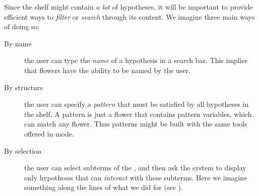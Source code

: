\begin{scope}
Since the shelf might contain \emph{a lot} of hypotheses, it will be important
to provide efficient ways to \emph{filter} or \emph{search} through its content.
We imagine three main ways of doing so:
\begin{description}
  \item[By name] the user can type the \emph{name} of a hypothesis in a
  search bar. This implies that flowers have the ability to be named by the
  user.
  \item[By structure] the user can specify a \emph{pattern} that must
  be satisfied by all hypotheses in the shelf. A pattern is just a flower that
  contains pattern variables, which can match any flower. Thus patterns might be
  built with the same tools offered in \Edit mode.
  \item[By selection] the user can select subterms of the , and
  then ask the system to display only hypotheses that can \emph{interact} with
  these subterms. Here we imagine something along the lines of what we did for
   (see ).
\end{description}





\end{scope}

